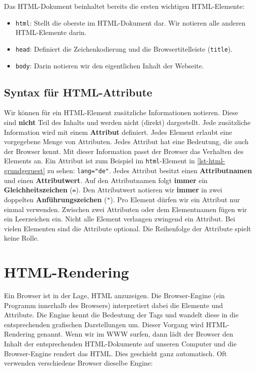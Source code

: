 Das \ac{HTML}-Dokument beinhaltet bereits die ersten wichtigen \ac{HTML}-Elemente:

\begin{itemize}
\item \lstinline[language=html]{html}: Stellt die oberste  im \ac{HTML}-Dokument dar. Wir notieren alle anderen HTML-Elemente darin.
\item \lstinline[language=html]{head}: Definiert die Zeichenkodierung und die Browsertitelleiste (\lstinline[language=html]{title}).
\item \lstinline[language=html]{body}: Darin notieren wir den eigentlichen Inhalt der Webseite.
\end{itemize}

\subsection{Syntax für \acs{HTML}-Attribute}

Wir können für ein \ac{HTML}-Element zusätzliche Informationen notieren. Diese sind \textbf{nicht} Teil des Inhalts und werden nicht (direkt) dargestellt. Jede zusätzliche Information wird mit einem \textbf{Attribut} definiert. Jedes Element erlaubt eine vorgegebene Menge von Attributen. Jedes Attribut hat eine Bedeutung, die auch der Browser kennt. Mit dieser Information passt der Browser das Verhalten des Elements an.  Ein Attribut ist zum Beispiel im \lstinline[language=html]{html}-Element in \autoref{lst-html-grundgeruest} zu sehen: \lstinline[language=html]{lang="de"}. Jedes Attribut besitzt einen \textbf{Attributnamen} und einen \textbf{Attributwert}. Auf den Attributnamen folgt \textbf{immer} ein \textbf{Gleichheitszeichen} (\texttt{=}). Den Attributwert notieren wir \textbf{immer} in zwei doppelten \textbf{Anführungszeichen} (\texttt{"}). Pro Element dürfen wir ein Attribut nur einmal verwenden. Zwischen zwei Attributen oder dem Elementnamen fügen wir ein Leerzeichen ein. Nicht alle Element verlangen zwingend ein Attribut. Bei vielen Elementen sind die Attribute optional. Die Reihenfolge der Attribute spielt keine Rolle.

\section{\acs{HTML}-Rendering}

Ein Browser ist in der Lage, \ac{HTML} anzuzeigen. Die Browser-Engine (ein Programm innerhalb des Browsers) interpretiert dabei die Elemente und Attribute. Die Engine kennt die Bedeutung der Tags und wandelt diese in die entsprechenden grafischen Darstellungen um. Dieser Vorgang wird \ac{HTML}-Rendering genannt. Wenn wir im \ac{WWW} surfen, dann lädt der Browser den Inhalt der entsprechenden \ac{HTML}-Dokumente auf unseren Computer und die Browser-Engine rendert das \ac{HTML}. Dies geschieht ganz automatisch. Oft verwenden verschiedene Browser dieselbe Engine:

